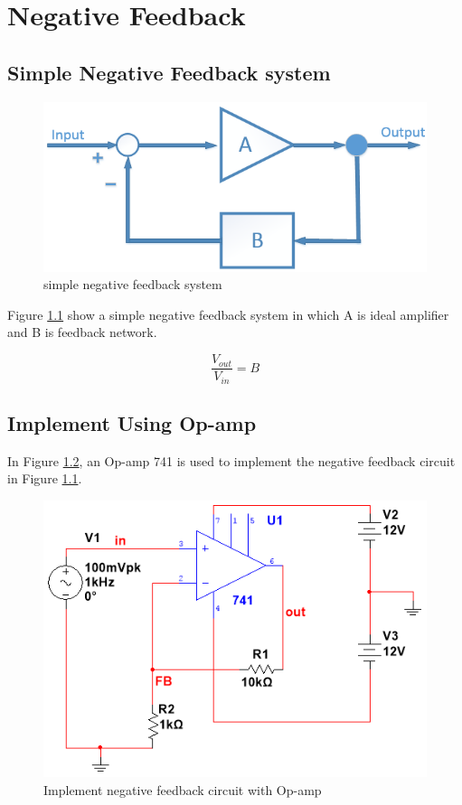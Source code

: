 \chapter{Negative Feedback}
\section{Simple Negative Feedback system}

\begin{figure}[htbp]
	\centering
	\includegraphics[scale=0.7]{"../Photo/Chap2/Feedback system"}
	\caption{simple negative feedback system}
	\label{fig:Feedback system}
\end{figure}

Figure \ref{fig:Feedback system} show a simple negative feedback system in which A is ideal amplifier and B is feedback network. 

\[  \frac{V_{out}}{V_{in}} = B  \] 
 



\section{Implement Using Op-amp}

In Figure \ref{fig:Op-amp feedback}, an Op-amp 741 is used to implement the negative feedback circuit in Figure \ref{fig:Feedback system}.

\begin{figure}[htbp]
	\centering
	\includegraphics[scale=0.7]{"../Photo/Chap2/Op-amp feedback"}
	\caption{Implement negative feedback circuit with Op-amp}
	\label{fig:Op-amp feedback}
\end{figure}




